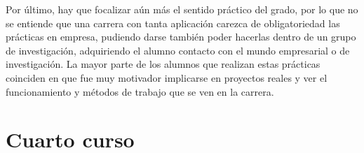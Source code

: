 Por último, hay que focalizar aún más el sentido práctico del grado, por lo que no se entiende que una carrera con tanta aplicación carezca de obligatoriedad las prácticas en empresa, pudiendo darse también poder hacerlas dentro de un grupo de investigación, adquiriendo el alumno contacto con el mundo empresarial o de investigación. La mayor parte de los alumnos que realizan estas prácticas coinciden en que fue muy motivador implicarse en proyectos reales y ver el funcionamiento y métodos de trabajo que se ven en la carrera.
\section{Cuarto curso}

